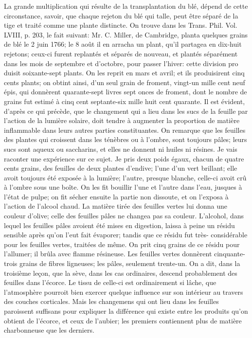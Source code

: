 La grande multiplication qui résulte de la transplantation du blé, dépend de cette circonstance, savoir, que chaque rejeton du blé qui talle, peut être séparé de la tige et traité comme une plante distincte. On trouve dans les Trans. Phil. Vol. LVIII, p. 203, le fait suivant: Mr. C. Miller, de Cambridge, planta quelques grains de blé le 2 juin 1766; le 8 août il en arracha un plant, qu'il partagea en dix-huit rejetons; ceux-ci furent replantés et séparés de nouveau, et plantés séparément dans les mois de septembre et d'octobre, pour passer l'hiver: cette division pro\setcounter{page}{85} duisit soixante-sept plants. On les reprit en mars et avril; et ils produisirent cinq cents plants; on obtint ainsi, d'un seul grain de froment, vingt-un mille cent neuf épis, qui donnèrent quarante-sept livres sept onces de froment, dont le nombre de grains fut estimé à cinq cent septante-six mille huit cent quarante.
Il est évident, d'après ce qui précède, que le changement qui a lieu dans les sucs de la feuille par l'action de la lumière solaire, doit tendre à augmenter la proportion de matière inflammable dans leurs autres parties constituantes. On remarque que les feuilles des plantes qui croissent dans les ténèbres ou à l'ombre, sont toujours pâles; leurs sucs sont aqueux ou saccharins, et elles ne donnent ni huiles ni résines. Je vais raconter une expérience sur ce sujet.
Je pris deux poids égaux, chacun de quatre cents grains, des feuilles de deux plantes d'endive; l'une d'un vert brillant; elle avoit toujours été exposée à la lumière; l'autre, presque blanche, celle-ci avoit crû à l'ombre sous une boîte. On les fit bouillir l'une et l'autre dans l'eau, jusques à l'état de pulpe; on fit sécher ensuite la partie non dissoute, et on l'exposa à l'action de l'alcool chaud. La matière tirée des feuilles vertes\setcounter{page}{86} lui donna une couleur d'olive; celle des feuilles pâles ne changea pas sa couleur. L'alcohol, dans lequel les feuilles pâles avoient été mises en digestion, laissa à peine un résidu sensible après qu'on l'eut fait évaporer; tandis que ce résidu fut très- considérable pour les feuilles vertes, traitées de même. On prit cinq grains de ce résidu pour l'allumer; il brûla avec flamme résineuse. Les feuilles vertes donnèrent cinquante-trois grains de fibres ligneuses; les pâles, seulement trente-un.
On a dit, dans la troisième leçon, que la sève, dans les cas ordinaires, descend probablement des feuilles dans l'écorce. Le tissu de celle-ci est ordinairement si lâche, que l'atmosphère pourroit bien exercer quelque influence sur son intérieur au travers des couches corticales. Mais les changemens qui ont lieu dans les feuilles paroissent suffisans pour expliquer la différence qui existe entre les produits qu'on obtient de l'écorce, et ceux de l'aubier; les premiers contiennent plus de matière charbonneuse que les derniers.
